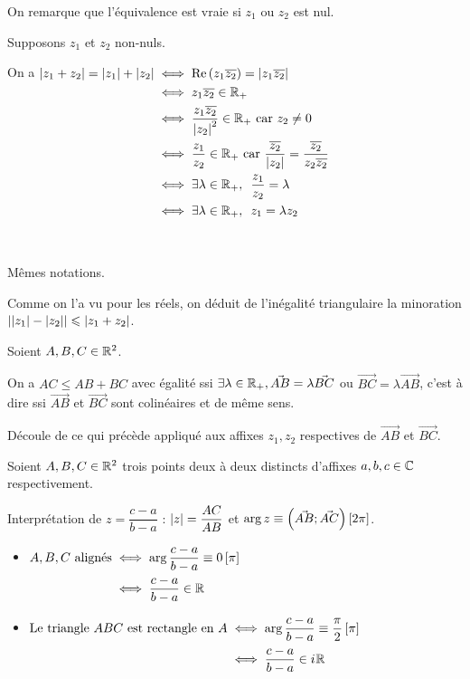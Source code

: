 \begin{dem}
On remarque que l'équivalence est vraie si \(z_1\) ou \(z_2\) est nul.

Supposons \(z_1\) et \(z_2\) non-nuls.

On a \(\begin{aligned}[t]
\abs{z_1+z_2}=\abs{z_1}+\abs{z_2}&\ssi\Re\paren{z_1\conj{z_2}}=\abs{z_1\conj{z_2}} \\
&\ssi z_1\conj{z_2}\in\Rp \\
&\ssi\dfrac{z_1\conj{z_2}}{\abs{z_2}^2}\in\Rp\text{ car }z_2\not=0 \\
&\ssi\dfrac{z_1}{z_2}\in\Rp\text{ car }\dfrac{\conj{z_2}}{\abs{z_2}}=\dfrac{\conj{z_2}}{z_2\conj{z_2}} \\
&\ssi\quantifs{\exists\lambda\in\Rp}\dfrac{z_1}{z_2}=\lambda \\
&\ssi\quantifs{\exists\lambda\in\Rp}z_1=\lambda z_2
\end{aligned}\)

~
\end{dem}

\begin{rem}
Mêmes notations.

Comme on l'a vu pour les réels, on déduit de l'inégalité triangulaire la minoration \(\left\lvert\left\lvert z_1\right\rvert-\left\lvert z_2\right\rvert\right\rvert\leqslant\left\lvert z_1+z_2\right\rvert\).
\end{rem}

\begin{cor}
Soient \(A,B,C\in\mathbb{R}^2\).

On a \(AC\leq AB+BC\) avec égalité ssi \(\exists\lambda\in\mathbb{R}_+,\vec{AB}=\lambda\vec{BC}\) ou \(\vec{BC}=\lambda\vec{AB}\), c'est à dire ssi \(\vec{AB}\) et \(\vec{BC}\) sont colinéaires et de même sens.
\end{cor}

\begin{dem}
Découle de ce qui précède appliqué aux affixes \(z_1,z_2\) respectives de \(\vec{AB}\) et \(\vec{BC}\).
\end{dem}

\begin{prop}
Soient \(A,B,C\in\mathbb{R}^2\) trois points deux à deux distincts d'affixes \(a,b,c\in\mathbb{C}\) respectivement.

Interprétation de \(z=\dfrac{c-a}{b-a}\) : \(\left\lvert z\right\rvert=\dfrac{AC}{AB}\) et \(\arg z\equiv\left(\vec{AB};\vec{AC}\right)\left[2\pi\right]\).
\end{prop}

\begin{ex}
\begin{itemize}
\item \(\begin{aligned}[t]
A,B,C\text{ alignés}&\iff\arg\dfrac{c-a}{b-a}\equiv0\left[\pi\right] \\
&\iff\dfrac{c-a}{b-a}\in\mathbb{R}
\end{aligned}\)

\item \(\begin{aligned}[t]
\text{Le triangle }ABC\text{ est rectangle en }A&\iff\arg\dfrac{c-a}{b-a}\equiv\dfrac{\pi}{2}\left[\pi\right] \\
&\iff\dfrac{c-a}{b-a}\in i\mkern1mu\mathbb{R}
\end{aligned}\)
\end{itemize}
\end{ex}

